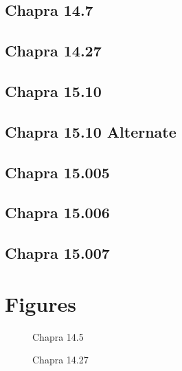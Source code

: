 \documentclass{article}
\begin{document}
\subsection{Chapra 14.7}
\pagebreak

\subsection{Chapra 14.27}
\pagebreak

\subsection{Chapra 15.10}
\pagebreak

\subsection{Chapra 15.10 Alternate}
\pagebreak

\subsection{Chapra 15.005}
\pagebreak

\subsection{Chapra 15.006}
\pagebreak

\subsection{Chapra 15.007}
\pagebreak

\section{Figures}
\begin{figure}[h!]
\begin{center}
\caption{Chapra 14.5}
\end{center}
\end{figure}
 
\begin{figure}[htb!]
\begin{center}
\caption{Chapra 14.27}
\end{center}
\end{figure}
\end{document}

